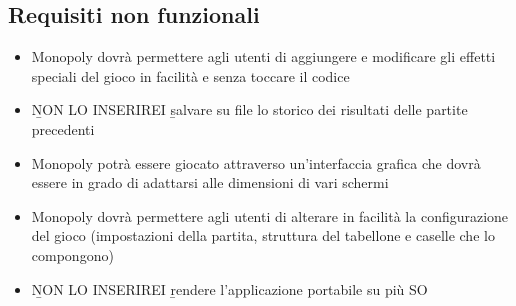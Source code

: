 \subsection*{Requisiti non funzionali}
\begin{itemize}
    \item 
    Monopoly dovrà permettere agli utenti di aggiungere e 
    modificare gli effetti speciali del gioco in facilità e senza toccare il codice
    \item \b NON LO INSERIREI \b salvare su file lo storico dei risultati delle partite precedenti
    \item Monopoly potrà essere giocato attraverso un'interfaccia grafica
    che dovrà essere in grado di adattarsi alle dimensioni di vari schermi
    \item 
    Monopoly dovrà permettere agli utenti di alterare in facilità la 
    configurazione del gioco (impostazioni della partita, struttura del tabellone e caselle che lo compongono)
    \item \b NON LO INSERIREI \b rendere l’applicazione portabile su più SO
\end{itemize}

